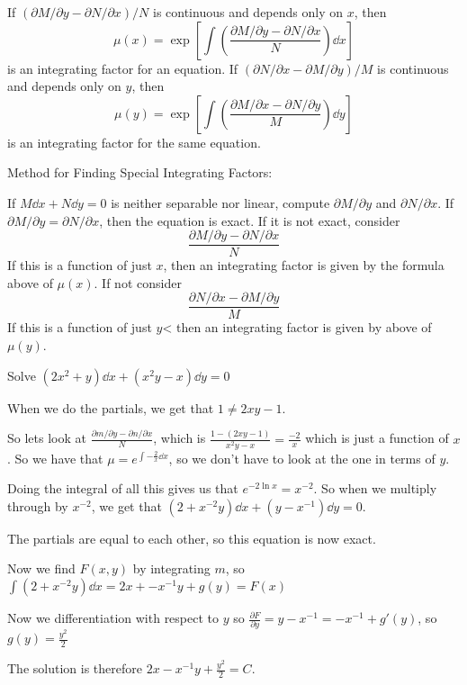 \documentclass[../diffeq.tex]{subfiles}
\begin{document}
\begin{theorem}
    If $(\partial M/\partial y-\partial N/\partial x)/N$ is continuous and depends only on $x$, then 
    \[ \mu(x)=\exp \left[\int \left(\frac{\partial M/\partial y-\partial N/\partial x}{N}\right)\dd x\right] \]
    is an integrating factor for an equation. If $(\partial N/\partial x - \partial M/\partial y)/M$ is continuous and depends only on $y$, then 
    \[ \mu(y)=\exp \left[\int \left(\frac{\partial M/\partial x-\partial N/\partial y}{M}\right)\dd y\right] \]
    is an integrating factor for the same equation.
\end{theorem}

Method for Finding Special Integrating Factors:

If $M\dd x + N\dd y = 0$ is neither separable nor linear, compute $\partial M/\partial y$ and $\partial N/\partial x$. If $\partial M/\partial y = \partial N/\partial x$, then the equation is exact. If it is not exact, consider 
\[ \frac{\partial M/\partial y-\partial N/\partial x}{N}\]
If this is a function of just $x$, then an integrating factor is given by the formula above of $\mu(x)$. If not consider 
\[ \frac{\partial N/\partial x - \partial M/\partial y}{M} \]
If this is a function of just $y$< then an integrating factor is given by above of $\mu(y)$.

\begin{example}
    Solve $(2x^2+y)\dd x + (x^2y-x)\dd y = 0$

    When we do the partials, we get that $1\neq 2xy-1$.

    So lets look at $\frac{\partial m/\partial y - \partial n/\partial x}{N}$, which is $\frac{1-(2xy-1)}{x^2y-x} = \frac{-2}{x}$ which is just a function of $x$. So we have that $\mu = e^{\int -\frac{2}{x}\dd x}$, so we don't have to look at the one in terms of $y$.

    Doing the integral of all this gives us that $e^{-2\ln x} = x^{-2}$. So when we multiply through by $x^{-2}$, we get that $(2+x^{-2}y) \dd x + (y-x^{-1})\dd y =0$.

    The partials are equal to each other, so this equation is now exact.

    Now we find $F(x,y)$ by integrating $m$, so $\int (2+x^{-2}y)\dd x = 2x+-x^{-1}y+g(y)=F(x)$

    Now we differentiation with respect to $y$ so $\frac{\partial F}{\partial y}=y-x^{-1}=-x^{-1}+g'(y)$, so $g(y)=\frac{y^2}{2}$

    The solution is therefore $2x-x^{-1}y+\frac{y^2}{2}=C$.
\end{example}
\end{document}
